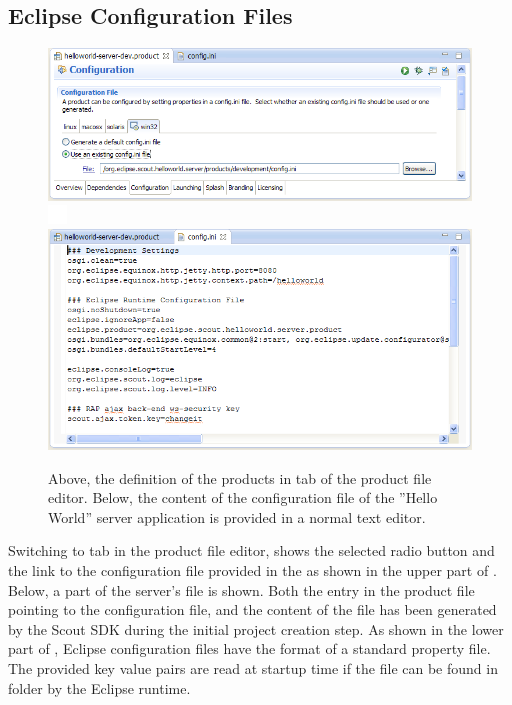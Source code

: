 \documentclass[a4paper,10pt,twoside]{book}
\begin{document}
\subsection{Eclipse Configuration Files}

\begin{figure}
\includegraphics[width=14cm]{sdk_server_dev_product_config.png} \\ 
\includegraphics[height=5mm]{white_pixel.png} \\
\includegraphics[width=14cm]{sdk_server_dev_configini.png} 
\caption{Above, the definition of the products  in tab  of the product file editor.
Below, the content of the configuration file of the ''Hello World'' server application is provided in a normal text editor.
}
\end{figure}

Switching to tab  in the product file editor, shows the selected radio button  and the link to the configuration file provided in the  as shown in the upper part of .
Below, a part of the server's  file is shown.
Both the entry in the product file pointing to the configuration file, and the content of the  file has been generated by the Scout SDK during the initial project creation step.
As shown in the lower part of , Eclipse configuration files have the format of a standard property file.
The provided key value pairs are read at startup time if the  file can be found in folder  by the Eclipse runtime.
\end{document}

